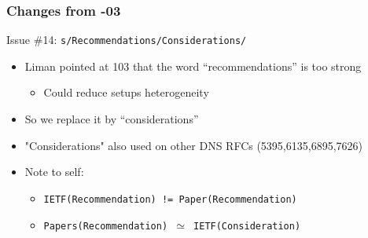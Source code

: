\documentclass[11pt,show 
notes,notheorems,noamsthm,blank]{beamer} %
\begin{document}
\begin{frame}
\frametitle{Changes from -03}
\begin{block}{ Issue \#14: \texttt{s/Recommendations/Considerations/}}
\begin{itemize}
 \item Liman pointed at 103 that the word ``recommendations'' is too strong
 \begin{itemize}

 \item Could reduce  setups heterogeneity 
 \end{itemize}
 \item So we replace it by ``considerations''
 \item "Considerations" also used on other DNS RFCs (5395,6135,6895,7626)

  \item Note to self: 
  \begin{itemize}
   \item \texttt{IETF(Recommendation) != Paper(Recommendation)} 
   \item \texttt{Papers(Recommendation) $\simeq$ IETF(Consideration)}
 
  \end{itemize}

\end{itemize}

 
\end{block}



\end{frame}
\end{document}
